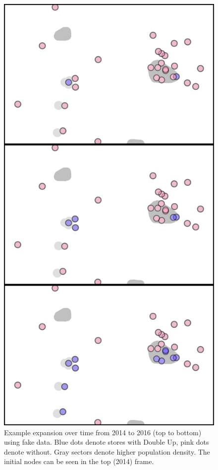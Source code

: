 \documentclass[11pt,letterpaperpaper,]{book}
\begin{document}
\begin{figure}

{\centering \includegraphics{figures/expansion-v} 

}

\caption{Example expansion over time from 2014 to 2016 (top to bottom) using fake data. Blue dots denote stores with Double Up, pink dots denote without. Gray sectors denote higher population density. The initial nodes can be seen in the top (2014) frame.}\label{fig:dufb-expansion}
\end{figure}
\end{document}
